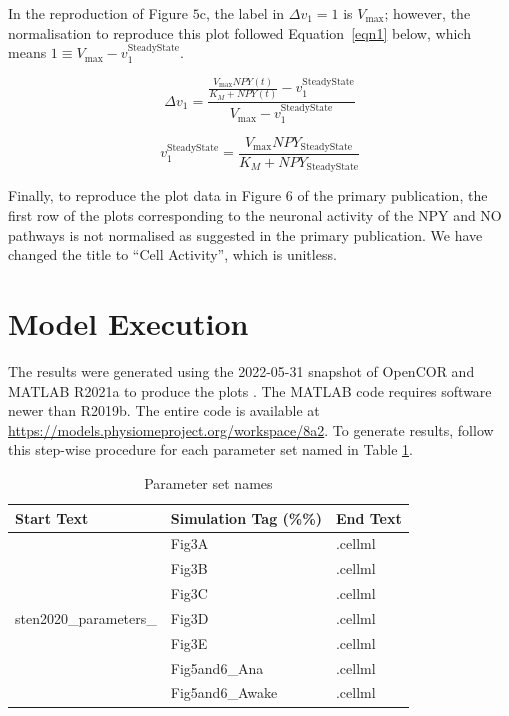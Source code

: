 \documentclass[fleqn,10pt]{physiome}
\begin{document}
In the reproduction of Figure $5$c, the label in $\Delta v_1=1$ is $V_\mathrm{max}$; however, the normalisation to reproduce this plot followed Equation~\ref{eqn1} below, which means $1\equiv V_\mathrm{max}-v_1^\mathrm{SteadyState}$. 

\begin{equation}
    \Delta v_1 = \frac{\frac{V_\mathrm{max}NPY(t)}{K_{M}+NPY(t)}-v_1^{\mathrm{SteadyState}}}{V_\mathrm{max}-v_1^{\mathrm{SteadyState}}}
    \label{eqn1}
\end{equation}

\begin{equation}
    v_1^\mathrm{SteadyState} = \frac{V_\mathrm{max}NPY_\mathrm{SteadyState}}{K_{M}+NPY_\mathrm{SteadyState}}
    \label{eqn2}
\end{equation}

Finally, to reproduce the plot data in Figure $6$ of the primary publication, the first row of the plots corresponding to the neuronal activity of the NPY and NO pathways is not normalised as suggested in the primary publication. We have changed the title to ``Cell Activity'', which is unitless.

\section{Model Execution}

The results were generated using the 2022-05-31 snapshot of OpenCOR \citep{Garny2015} and MATLAB R2021a to produce the plots \citep{MATLABR2021a}. The MATLAB code requires software newer than R2019b. The entire code is available at \url{https://models.physiomeproject.org/workspace/8a2}. To generate results, follow this step-wise procedure for each parameter set named in Table \ref{table:2}. 

\begin{table}[htb]
\begin{center}
    \caption{Parameter set names}\label{table:2}
    \begin{tabular}{l l l}
        \toprule
        Start Text & Simulation Tag (\%\%) & End Text \\
        \bottomrule
         & Fig3A & .cellml\\
         & Fig3B & .cellml\\
         & Fig3C & .cellml\\
         sten2020\_parameters\_& Fig3D & .cellml\\
         & Fig3E & .cellml\\
         & Fig5and6\_Ana & .cellml\\
         & Fig5and6\_Awake & .cellml\\
        \bottomrule
    \end{tabular}
    \end{center}
\end{table}
\end{document}
